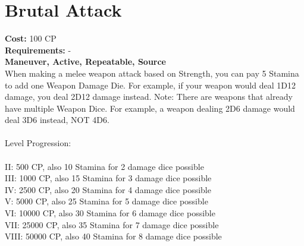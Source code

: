 \section{Brutal Attack}
\textbf{Cost:} 100 CP\\
\textbf{Requirements:} -\\
\textbf{Maneuver, Active, Repeatable, Source}\\
When making a melee weapon attack based on Strength, you can pay 5 Stamina to add one Weapon Damage Die. For example, if your weapon would deal 1D12 damage, you deal 2D12 damage instead. Note: There are weapons that already have multiple Weapon Dice. For example, a weapon dealing 2D6 damage would deal 3D6 instead, NOT 4D6.\\
\\
Level Progression:\\
\\
II: 500 CP, also 10 Stamina for 2 damage dice possible\\
III: 1000 CP, also 15 Stamina for 3 damage dice possible\\
IV: 2500 CP, also 20 Stamina for 4 damage dice possible\\
V: 5000 CP, also 25 Stamina for 5 damage dice possible\\
VI: 10000 CP, also 30 Stamina for 6 damage dice possible\\
VII: 25000 CP, also 35 Stamina for 7 damage dice possible\\
VIII: 50000 CP, also 40 Stamina for 8 damage dice possible\\
